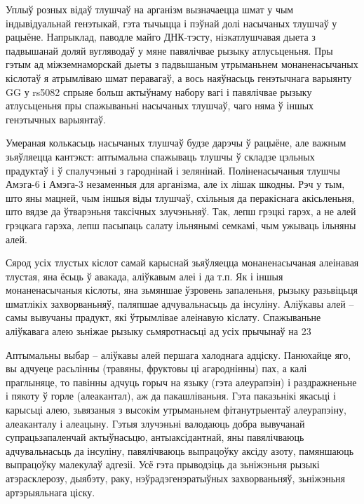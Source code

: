 Уплыў розных відаў тлушчаў на арганізм вызначаецца шмат у чым індывідуальнай генэтыкай, гэта тычыцца і пэўнай долі насычаных тлушчаў у рацыёне. Напрыклад, паводле майго ДНК-тэсту, нізкатлушчавая дыета з падвышанай доляй вугляводаў у мяне павялічвае рызыку атлусьценьня. Пры гэтым ад міжземнаморскай дыеты з падвышаным утрыманьнем монаненасычаных кіслотаў я атрымліваю шмат перавагаў, а вось наяўнасьць генэтычнага варыянту GG у rs5082 спрыяе больш актыўнаму набору вагі і павялічвае рызыку атлусьценьня пры спажываньні насычаных тлушчаў, чаго няма ў іншых генэтычных варыянтаў.

Умераная колькасьць насычаных тлушчаў будзе дарэчы ў рацыёне, але важным зьяўляецца кантэкст: аптымальна спажываць тлушчы ў складзе цэльных прадуктаў і ў спалучэньні з гароднінай і зелянінай. Поліненасычаныя тлушчы Амэга-6 і Амэга-3 незаменныя для арганізма, але іх лішак шкодны. Рэч у тым, што яны мацней, чым іншыя віды тлушчаў, схільныя да перакіснага акісьленьня, што вядзе да ўтварэньня таксічных злучэньняў. Так, лепш грэцкі гарэх, а не алей грэцкага гарэха, лепш пасыпаць салату ільнянымі семкамі, чым ужываць ільняны алей.

Сярод усіх тлустых кіслот самай карыснай зьяўляецца монаненасычаная алеінавая тлустая, яна ёсьць ў авакада, аліўкавым алеі і да т.п. Як і іншыя монаненасычаныя кіслоты, яна зьмяншае ўзровень запаленьня, рызыку разьвіцьця шматлікіх захворваньняў, паляпшае адчувальнасьць да інсуліну. Аліўкавы алей – самы вывучаны прадукт, які ўтрымлівае алеінавую кіслату. Спажываньне аліўкавага алею зьніжае рызыку сьмяротнасьці ад усіх прычынаў на 23%

Аптымальны выбар – аліўкавы алей першага халоднага адціску. Панюхайце яго, вы адчуеце расьлінны (травяны, фруктовы ці агароднінны) пах, а калі праглыняце, то павінны адчуць горыч на языку (гэта алеурапэін) і раздражненьне і пякоту ў горле (алеакантал), аж да пакашліваньня. Гэта паказьнікі якасьці і карысьці алею, зьвязаныя з высокім утрыманьнем фітанутрыентаў алеурапэіну, алеаканталу і алеацыну. Гэтыя злучэньні валодаюць добра вывучанай супрацьзапаленчай актыўнасьцю, антыаксідантнай, яны павялічваюць адчувальнасьць да інсуліну, павялічваюць выпрацоўку аксіду азоту, памяншаюць выпрацоўку малекулаў адгезіі. Усё гэта прыводзіць да зьніжэньня рызыкі атэрасклерозу, дыябэту, раку, нэўрадэгенэратыўных захворваньняў, зьніжэньня артэрыяльнага ціску.

